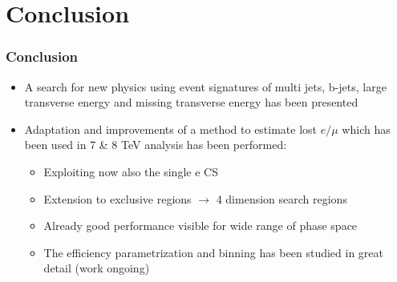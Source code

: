 \documentclass{beamer}
\begin{document}
\section{Conclusion}
\begin{frame}
 \frametitle{Conclusion}
 \begin{itemize}
  \item A search for new physics using event signatures of multi jets, b-jets, large transverse energy and missing transverse energy has been presented
  \item Adaptation and improvements of a method to estimate lost $e/\mu$ which has been used in 7 \& 8 TeV analysis has been performed:
  \begin{itemize}
   \item Exploiting now also the single e CS
   \item Extension to exclusive \BTags regions $\rightarrow$ 4 dimension search regions
   \item Already good performance visible for wide range of phase space
   \item The efficiency parametrization and binning has been studied in great detail (work ongoing)
  \end{itemize}

  \end{itemize}
%

\end{frame}
\end{document}
